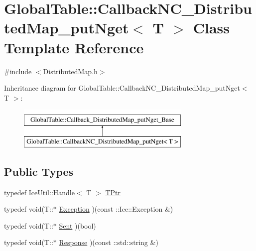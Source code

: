 \hypertarget{class_global_table_1_1_callback_n_c___distributed_map__put_nget}{
\section{GlobalTable::CallbackNC\_\-DistributedMap\_\-putNget$<$ T $>$ Class Template Reference}
\label{class_global_table_1_1_callback_n_c___distributed_map__put_nget}
}


{\ttfamily \#include $<$DistributedMap.h$>$}

Inheritance diagram for GlobalTable::CallbackNC\_\-DistributedMap\_\-putNget$<$ T $>$:\begin{figure}[H]
\begin{center}
\leavevmode
\includegraphics[height=2cm]{class_global_table_1_1_callback_n_c___distributed_map__put_nget}
\end{center}
\end{figure}
\subsection*{Public Types}
\begin{DoxyCompactItemize}
\item 
typedef IceUtil::Handle$<$ T $>$ \hyperlink{class_global_table_1_1_callback_n_c___distributed_map__put_nget_af10659383ce85f40612aa261f2b226db}{TPtr}
\item 
typedef void(T::$\ast$ \hyperlink{class_global_table_1_1_callback_n_c___distributed_map__put_nget_a980c60b282bce6f892681856c3bf80f9}{Exception} )(const ::Ice::Exception \&)
\item 
typedef void(T::$\ast$ \hyperlink{class_global_table_1_1_callback_n_c___distributed_map__put_nget_ab35fdf71fb5a996677b4a7c079a00f6f}{Sent} )(bool)
\item 
typedef void(T::$\ast$ \hyperlink{class_global_table_1_1_callback_n_c___distributed_map__put_nget_add8ea77c4ddeceea21ef6446f089e8a5}{Response} )(const ::std::string \&)
\end{DoxyCompactItemize}
